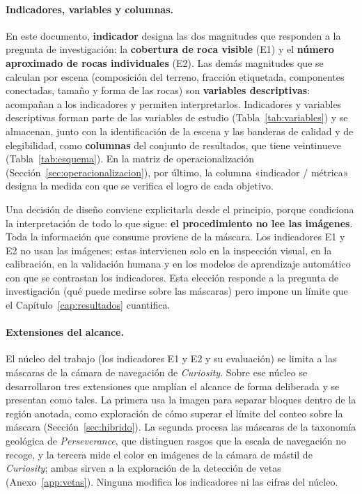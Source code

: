 \paragraph{Indicadores, variables y columnas.} En este documento, \textbf{indicador} designa
las dos magnitudes que responden a la pregunta de investigación: la \textbf{cobertura de roca
visible} (E1) y el \textbf{número aproximado de rocas individuales} (E2). Las demás magnitudes
que se calculan por escena (composición del terreno, fracción etiquetada, componentes
conectadas, tamaño y forma de las rocas) son \textbf{variables descriptivas}: acompañan a los
indicadores y permiten interpretarlos. Indicadores y variables descriptivas forman parte de las
variables de estudio (Tabla~\ref{tab:variables}) y se almacenan, junto con la identificación de
la escena y las banderas de calidad y de elegibilidad, como \textbf{columnas} del conjunto de
resultados, que tiene veintinueve (Tabla~\ref{tab:esquema}). En la matriz de
operacionalización (Sección~\ref{sec:operacionalizacion}), por último, la columna
«indicador / métrica» designa la medida con que se verifica el logro de cada objetivo.

Una decisión de diseño conviene explicitarla desde el principio, porque condiciona la
interpretación de todo lo que sigue: \textbf{el procedimiento no lee las imágenes}. Toda
la información que consume proviene de la máscara. Los indicadores E1 y E2 no usan las
imágenes; estas intervienen solo en la inspección visual, en la calibración, en la validación
humana y en los modelos de aprendizaje automático con que se contrastan los indicadores.
Esta elección responde a la pregunta de investigación (qué puede medirse sobre las
máscaras) pero impone un límite que el Capítulo~\ref{cap:resultados} cuantifica.

\paragraph{Extensiones del alcance.} El núcleo del trabajo (los indicadores E1 y E2 y su
evaluación) se limita a las máscaras de la cámara de navegación de \textit{Curiosity}. Sobre
ese núcleo se desarrollaron tres extensiones que amplían el alcance de forma deliberada y se
presentan como tales. La primera usa la imagen para separar bloques dentro de la región anotada,
como exploración de cómo superar el límite del conteo sobre la máscara
(Sección~\ref{sec:hibrido}). La segunda procesa las máscaras de la taxonomía geológica de
\textit{Perseverance}, que distinguen rasgos que la escala de navegación no recoge, y la
tercera mide el color en imágenes de la cámara de mástil de \textit{Curiosity}; ambas sirven
a la exploración de la detección de vetas (Anexo~\ref{app:vetas}). Ninguna modifica los
indicadores ni las cifras del núcleo.

